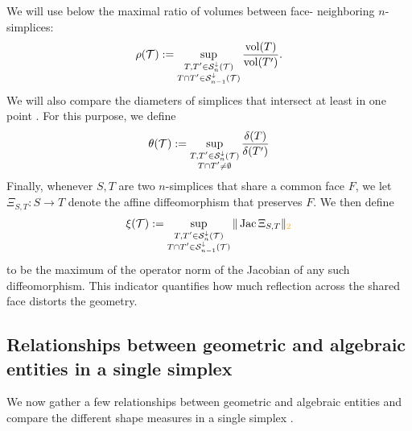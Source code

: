 \documentclass[10pt,letterpaper]{article}
\newcommand\cye[1]{%
  \protect\leavevmode
  \begingroup
    \color{red!35!yellow}%
    #1%
  \endgroup
}
\begin{document}
\cye{We will use below} the maximal ratio of volumes between \cye{face-}neighboring $n$-simplices: 
\begin{align}\label{math:volumecomparisonmeasure}
    \rho({\mathcal T}) := \sup_{ \substack{ T, T' \in {\mathcal S}^{\downarrow}_{n}({\mathcal T}) \\ T \cap T' \in {\mathcal S}^{\downarrow}_{n-1}({\mathcal T}) } } \frac{ \operatorname{vol}(T) }{ \operatorname{vol}(T') }.
\end{align}
We \cye{will also} compare the diameters of simplices that intersect \cye{at least in one point}. \cye{For this purpose,} we define 
\begin{align}\label{math:diametercomparison}
    \theta({\mathcal T}) 
    := 
    \sup_{ \substack{ T, T' \in {\mathcal S}^{\downarrow}_{n}({\mathcal T}) \\ T \cap T' \neq \emptyset } }
    \frac{ {\delta}(T) }{ {\delta}(T') }
\end{align}
\cye{Finally,} whenever $S,T$ are two $n$-simplices that share a common face $F$, we let $\Xi_{S,T} : S \rightarrow T$ denote the affine diffeomorphism 
that preserves $F$. We \cye{then} define 
\begin{align}\label{math:reflectionmeasure}
    \xi(\calT) 
    := 
    \sup_{ \substack{ T, T' \in \subsimplex_{n}(\calT) \\ T \cap T' \in \subsimplex_{n-1}(\calT) } }
    \| \Jacobian \Xi_{S,T} \|_{\cye{2}}
\end{align}
to be the maximum of the operator norm of the Jacobian of any such diffeomorphism. 
This indicator quantifies how much reflection across the shared face distorts the geometry. 


\subsection{\cye{Relationships between geometric and algebraic entities in a single simplex}}

We \cye{now} gather a few relationships between geometric and algebraic entities and compare the different shape measures \cye{in a single simplex}.
\end{document}
